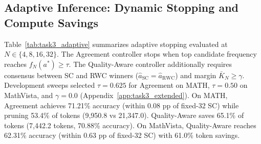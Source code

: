 \documentclass{article}
\begin{document}
\begin{table}[!htbp]
\centering
\caption{Adaptive inference evaluation on 800 held-out evaluation questions. Premature stopping denotes stopping early on an answer that proved incorrect when fixed-32 SC was correct.}
\label{tab:task3_adaptive}
\end{table}

\subsection{Adaptive Inference: Dynamic Stopping and Compute Savings}
Table~\ref{tab:task3_adaptive} summarizes adaptive stopping evaluated at $N \in \{4, 8, 16, 32\}$. The Agreement controller stops when top candidate frequency reaches $f_N(a^*) \ge \tau$. The Quality-Aware controller additionally requires consensus between SC and RWC winners ($\hat{a}_{\mathrm{SC}} = \hat{a}_{\mathrm{RWC}}$) and margin $\bar{K}_N \ge \gamma$. Development sweeps selected $\tau=0.625$ for Agreement on MATH, $\tau=0.50$ on MathVista, and $\gamma=0.0$ (Appendix~\ref{app:task3_extended}). On MATH, Agreement achieves 71.21\% accuracy (within 0.08 pp of fixed-32 SC) while pruning 53.4\% of tokens (9,950.8 vs 21,347.0). Quality-Aware saves 65.1\% of tokens (7,442.2 tokens, 70.88\% accuracy). On MathVista, Quality-Aware reaches 62.31\% accuracy (within 0.63 pp of fixed-32 SC) with 61.0\% token savings.
\end{document}
